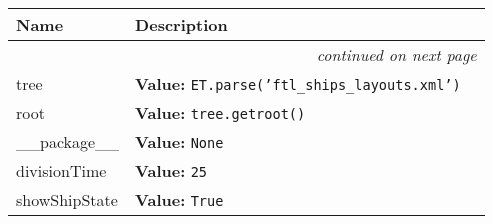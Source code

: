     \vspace{-1cm}
\hspace{\varindent}\begin{longtable}{|p{\varnamewidth}|p{\vardescrwidth}|l}
\cline{1-2}
\cline{1-2} \centering \textbf{Name} & \centering \textbf{Description}& \\
\cline{1-2}
\endhead\cline{1-2}\multicolumn{3}{r}{\small\textit{continued on next page}}\\\endfoot\cline{1-2}
\endlastfoot\raggedright t\-r\-e\-e\- & \raggedright \textbf{Value:} 
{\tt ET.parse('ftl\_ships\_layouts.xml')}&\\
\cline{1-2}
\raggedright r\-o\-o\-t\- & \raggedright \textbf{Value:} 
{\tt tree.getroot()}&\\
\cline{1-2}
\raggedright \_\-\_\-p\-a\-c\-k\-a\-g\-e\-\_\-\_\- & \raggedright \textbf{Value:} 
{\tt None}&\\
\cline{1-2}
\raggedright d\-i\-v\-i\-s\-i\-o\-n\-T\-i\-m\-e\- & \raggedright \textbf{Value:} 
{\tt 25}&\\
\cline{1-2}
\raggedright s\-h\-o\-w\-S\-h\-i\-p\-S\-t\-a\-t\-e\- & \raggedright \textbf{Value:} 
{\tt True}&\\
\cline{1-2}
\end{longtable}

